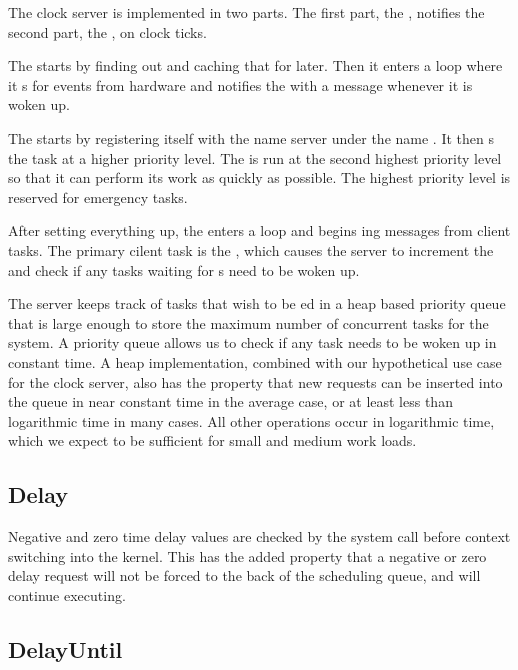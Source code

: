 \documentclass[pdftex,10pt,a4paper]{article}
\begin{document}
The clock server is implemented in two parts. The first part, the
, notifies the second part, the
, on clock ticks.

The  starts by finding out 
and caching that  for later. Then it enters a 
loop where it s for  events from hardware
and notifies the  with a  message whenever it
is woken up.

The  starts by registering itself with the name
server under the name . It then s the
 task at a higher priority level. The
 is run at the second highest priority level so
that it can perform its work as quickly as possible. The highest
priority level is reserved for emergency tasks.

After setting everything up, the  enters a
 loop and begins ing messages from client
tasks. The primary cilent task is the , which
causes the server to increment the  and check if any tasks
waiting for s need to be woken up.

The server keeps track of tasks that wish to be ed in a
heap based priority queue that is large enough to store the maximum
number of concurrent tasks for the system. A priority queue allows us
to check if any task needs to be woken up in constant time. A heap
implementation, combined with our hypothetical use case for the clock
server, also has the property that new  requests can be
inserted into the queue in near constant time in the average case, or
at least less than logarithmic time in many cases. All other
operations occur in logarithmic time, which we expect to be sufficient
for small and medium work loads.

\subsection*{Delay}

Negative and zero time delay values are checked by the system call
before context switching into the kernel. This has the added property
that a negative or zero delay request will not be forced to the back
of the scheduling queue, and will continue executing.

\subsection*{DelayUntil}
\end{document}
